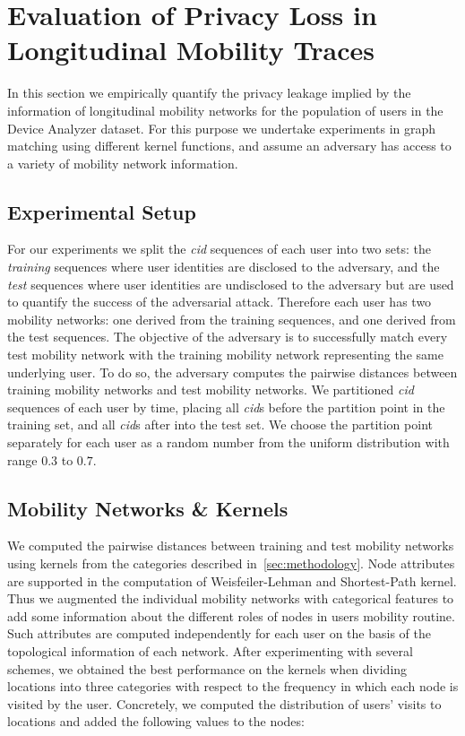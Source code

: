 \section{Evaluation of Privacy Loss in Longitudinal Mobility Traces}

In this section we empirically quantify the privacy leakage implied by the information of longitudinal mobility networks for the population of users in the Device Analyzer dataset.
For this purpose we undertake experiments in graph matching using different kernel functions, and assume an adversary has access to a variety of mobility network information.

\subsection{Experimental Setup}

For our experiments we split the \emph{cid} sequences of each user into two sets: the \emph{training} sequences where user identities are disclosed to the adversary, and the \emph{test} sequences where user identities are undisclosed to the adversary but are used to quantify the success of the adversarial attack.
Therefore each user has two mobility networks: one derived from the training sequences, and one derived from the test sequences.
The objective of the adversary is to successfully match every test mobility network with the training mobility network representing the same underlying user.
To do so, the adversary computes the pairwise distances between training mobility networks and test mobility networks.
We partitioned \emph{cid} sequences of each user by time, placing all \emph{cid}s before the partition point in the training set, and all \emph{cid}s after into the test set.
We choose the partition point separately for each user as a random number from the uniform distribution with range $ 0.3 $ to $ 0.7 $.

\subsection{Mobility Networks \& Kernels}

We computed the pairwise distances between training and test mobility networks using kernels from the categories described in~\cref{sec:methodology}.
Node attributes are supported in the computation of Weisfeiler-Lehman and Shortest-Path kernel.
Thus we augmented the individual mobility networks with categorical features to add some information about the different roles of nodes in users mobility routine.
Such attributes are computed independently for each user on the basis of the topological information of each network.
After experimenting with several schemes, we obtained the best performance on the kernels when dividing locations into three categories with respect to the frequency in which each node is visited by the user.
Concretely, we computed the distribution of users' visits to locations and added the following values to the nodes:

